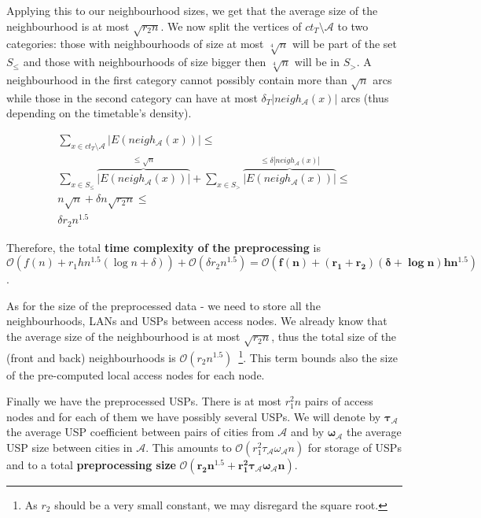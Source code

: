 		\noindent Applying this to our neighbourhood sizes, we get that the average size of the neighbourhood is at most $\sqrt{r_{2}n}$.  We now split the vertices of $ct_{T} \setminus \mathcal{A}$ to two categories: those with neighbourhoods of size at most $\sqrt[4]{n}$ will be part of the set $S_{\leq}$ and those with neighbourhoods of size bigger then $\sqrt[4]{n}$ will be in $S_{>}$. A neighbourhood in the first category cannot possibly contain more than $\sqrt{n}$ arcs while those in the second category can have at most $\delta_{T}|neigh_{\mathcal{A}}(x)|$ arcs (thus depending on the timetable's density).
		
		\begin{align*}
		\sum_{x \in ct_{T} \setminus \mathcal{A}} |E(neigh_{\mathcal{A}}(x))| \leq \\
		\sum_{x \in S_{\leq}} \overbrace{|E(neigh_{\mathcal{A}}(x))|}^{\leq \sqrt{n}} + 
			\sum_{x \in S_{>}} \overbrace{|E(neigh_{\mathcal{A}}(x))|}^{\leq \delta|neigh_{\mathcal{A}}(x)|} \leq \\
		n \sqrt{n} + \delta n \sqrt{r_{2}n} \leq \\
		\delta r_{2} n^{1.5}
		\end{align*}
		
		\noindent Therefore, the total \textbf{time complexity of the preprocessing} is $\mathcal{O}(f(n) + r_{1}hn^{1.5} (\log n + \delta)) + \mathcal{O}(\delta r_{2} n^{1.5}) = \bm{\mathcal{O}(f(n) + (r_{1} + r_{2}) (\delta + \log n) h n^{1.5})}$.
		
		As for the size of the preprocessed data - we need to store all the neighbourhoods, LANs and USPs between access nodes. We already know that the average size of the neighbourhood is at most $\sqrt{r_{2}n}$, thus the total size of the (front and back) neighbourhoods is $\mathcal{O}(r_{2} n^{1.5})$~\footnote{As $r_{2}$ should be a very small constant, we may disregard the square root.}. This term bounds also the size of the pre-computed local access nodes for each node.
		
		Finally we have the preprocessed USPs. There is at most $r_{1}^{2}n$ pairs of access nodes and for each of them we have possibly several USPs. We will denote by $\bm{\tau_{\mathcal{A}}}$ the average USP coefficient between pairs of cities from $\mathcal{A}$ and by $\bm{\omega_{\mathcal{A}}}$ the average USP size between cities in $\mathcal{A}$. This amounts to $\mathcal{O}(r_{1}^{2} \tau_{\mathcal{A}} \omega_{\mathcal{A}} n)$ for storage of USPs and to a total \textbf{preprocessing size} $\bm{\mathcal{O}(r_{2} n^{1.5} + r_{1}^{2} \tau_{\mathcal{A}} \omega_{\mathcal{A}} n)}$.
		
